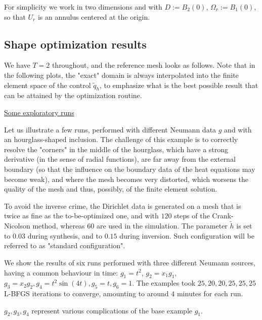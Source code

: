 \documentclass[english,a4paper,9pt,oneside]{scrbook}	%
\theoremstyle{break}
\theoremstyle{remark}
\begin{document}
For simplicity we work in two dimensions and with $D:=B_2(0)$, $\Omega_r := B_{1}(0)$, so that $U_r$ is an annulus centered at the origin. 

\subsection{Shape optimization results}

We have $T=2$ throughout, and the reference mesh looks as follows. Note that in the following plots, the "exact" domain is always interpolated into the finite element space of the control $\tilde{q}_h$, to emphasize what is the best possible result that can be attained by the optimization routine.
%

\underline{Some exploratory runs}

Let us illustrate a few runs, performed with different Neumann data $g$ and with an hourglass-shaped inclusion. The challenge of this example is to correctly resolve the "corners" in the middle of the hourglass, which have a strong derivative (in the sense of radial functions), are far away from the external boundary (so that the influence on the boundary data of the heat equations may become weak), and where the mesh becomes very distorted, which worsens the quality of the mesh and thus, possibly, of the finite element solution.

To avoid the inverse crime, the Dirichlet data is generated on a mesh that is twice as fine as the to-be-optimized one, and with $120$ steps of the Crank-Nicolson method, whereas $60$ are used in the simulation. The parameter $\tilde{h}$ is set to $0.03$ during synthesis, and to $0.15$ during inversion. Such configuration will be referred to as "standard configuration".

We show the results of six runs performed with three different Neumann sources, having a common behaviour in time: $g_1 = t^2$, $g_2 = x_1g_1$, $g_3=x_2g_2, g_4 = t^2\sin(4t), g_5 = t, g_6 = 1$. The examples took $25, 20, 20, 25, 25, 25$ L-BFGS iterations to converge, amounting to around $4$ minutes for each run.

$g_2, g_3, g_4$ represent various complications of the base example $g_1$. 
\end{document}
